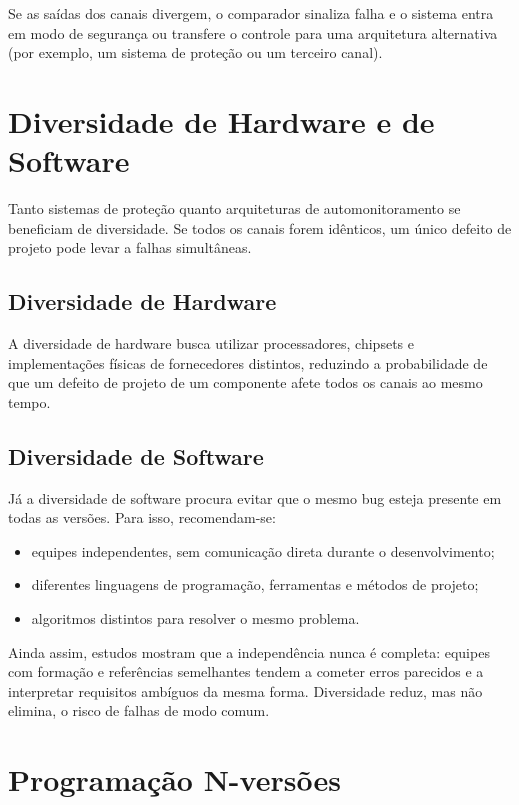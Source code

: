 \documentclass[12pt,a4paper,twoside]{report}
\begin{document}
Se as saídas dos canais divergem, o comparador sinaliza falha e o sistema
entra em modo de segurança ou transfere o controle para uma arquitetura
alternativa (por exemplo, um sistema de proteção ou um terceiro canal).

\section{Diversidade de Hardware e de Software}

Tanto sistemas de proteção quanto arquiteturas de automonitoramento se
beneficiam de diversidade. Se todos os canais forem idênticos, um único
defeito de projeto pode levar a falhas simultâneas.

\subsection{Diversidade de Hardware}

A diversidade de hardware busca utilizar processadores, chipsets e
implementações físicas de fornecedores distintos, reduzindo a probabilidade
de que um defeito de projeto de um componente afete todos os canais ao
mesmo tempo.

\subsection{Diversidade de Software}

Já a diversidade de software procura evitar que o mesmo bug esteja presente
em todas as versões. Para isso, recomendam-se:
\begin{itemize}[nosep]
    \item equipes independentes, sem comunicação direta durante o
    desenvolvimento;
    \item diferentes linguagens de programação, ferramentas e métodos de
    projeto;
    \item algoritmos distintos para resolver o mesmo problema.
\end{itemize}

Ainda assim, estudos mostram que a independência nunca é completa: equipes
com formação e referências semelhantes tendem a cometer erros parecidos e
a interpretar requisitos ambíguos da mesma forma. Diversidade reduz, mas
não elimina, o risco de falhas de modo comum.

\section{Programação N-versões}
\end{document}

